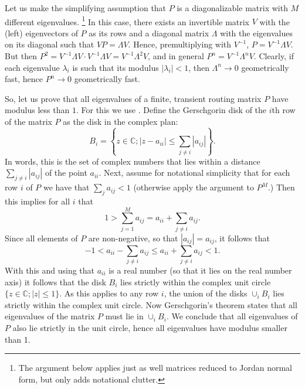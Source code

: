\begin{exercise}
\begin{solution}
\end{solution}
\end{exercise}


Let us make the simplifying assumption that $P$ is a diagonalizable matrix with $M$ different eigenvalues.
\footnote{The argument below applies just as well matrices reduced to Jordan normal form, but only adds notational clutter.}
In this case, there exists an invertible matrix $V$ with the (left) eigenvectors of $P$ as its rows and a diagonal matrix $\Lambda$ with the eigenvalues on its diagonal such that $ V P = \Lambda V$.
Hence, premultiplying with $V^{-1}$, $ P = V^{-1}\Lambda V$.
But then $P^2 = V^{-1}\Lambda V \cdot V^{-1}\Lambda V= V^{-1}\Lambda^2 V$, and in general $P^n = V^{-1}\Lambda^n V$.
Clearly, if each eigenvalue $\lambda_i$ is such that its modulus $|\lambda_i| < 1$, then $\Lambda^n \to 0$ geometrically fast, hence $P^n\to 0$ geometrically fast.

So, let us prove that all eigenvalues of a finite, transient routing matrix $P$ have modulus less than $1$.
For this we use .
Define the Gerschgorin disk of the $i$th row of the matrix $P$ as the disk in the complex plan:
\begin{equation*}
B_i=\left\{z\in \mathbb{C};  |z-a_{ii}|\leq \sum_{j\neq i} |a_{i j}| \right\}.  
\end{equation*}
In words, this is the set of complex numbers that lies within a distance $\sum_{j\neq i} |a_{i j}|$ of the point $a_{i i}$.
Next, assume for notational simplicity that for each row $i$ of $P$ we have that $\sum_{j} a_{i j}<1$ (otherwise apply the argument to $P^M$.)
Then this implies for all $i$ that
\begin{equation*}
1> \sum_{j=1}^M a_{i j} =  a_{ii} + \sum_{j\neq i} a_{i j}.
\end{equation*}
Since all elements of $P$ are non-negative, so that $|a_{i j}| = a_{i j }$, it follows that
\begin{equation*}
-1 < a_{ii} - \sum_{j\neq i} a_{i j} \leq a_{ii} + \sum_{j\neq i} a_{i j} < 1. 
\end{equation*}
With this and using that $a_{ii}$ is a real number (so that it lies on the real number axis) it follows that the disk $B_i $ lies strictly within the complex unit circle $\{z \in \mathbb{C}; |z|\leq 1\}$.
As this applies to any row $i$, the union of the disks $\cup_{i} B_{i}$ lies strictly within the complex unit circle.
Now Gerschgorin's theorem states that all eigenvalues of the matrix $P$ must lie in $\cup_i B_i$. 
We conclude that all eigenvalues of $P$ also lie strictly in the unit circle, hence all eigenvalues have modulus smaller than 1.



